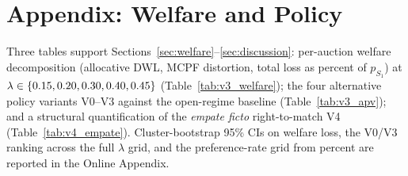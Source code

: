 







\section{Appendix: Welfare and Policy}\label{app:welfare}

Three tables support Sections~\ref{sec:welfare}--\ref{sec:discussion}: per-auction welfare decomposition (allocative DWL, MCPF distortion, total loss as percent of $p_{S_1}$) at $\lambda \in \{0.15, 0.20, 0.30, 0.40, 0.45\}$ (Table~\ref{tab:v3_welfare}); the four alternative policy variants V0--V3 against the open-regime baseline (Table~\ref{tab:v3_apv}); and a structural quantification of the \emph{empate ficto} right-to-match V4 (Table~\ref{tab:v4_empate}). Cluster-bootstrap 95\% CIs on welfare loss, the V0/V3 ranking across the full $\lambda$ grid, and the preference-rate grid from \prefGridRange{} percent are reported in the Online Appendix.






